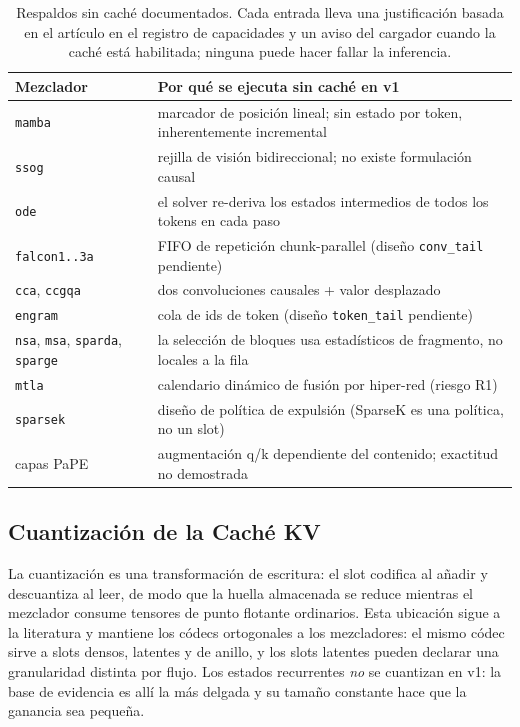 \begin{table}[H]
\centering
\small
\begin{tabularx}{0.98\linewidth}{l X}
\toprule
\textbf{Mezclador} & \textbf{Por qué se ejecuta sin caché en v1} \\
\midrule
\texttt{mamba} & marcador de posición lineal; sin estado por token, inherentemente incremental \\
\texttt{ssog} & rejilla de visión bidireccional; no existe formulación causal \\
\texttt{ode} & el solver re-deriva los estados intermedios de todos los tokens en cada paso \\
\texttt{falcon1..3a} & FIFO de repetición chunk-parallel (diseño \texttt{conv\_tail} pendiente) \\
\texttt{cca}, \texttt{ccgqa} & dos convoluciones causales + valor desplazado \\
\texttt{engram} & cola de ids de token (diseño \texttt{token\_tail} pendiente) \\
\texttt{nsa}, \texttt{msa}, \texttt{sparda}, \texttt{sparge} & la selección de bloques usa estadísticos de fragmento, no locales a la fila \\
\texttt{mtla} & calendario dinámico de fusión por hiper-red (riesgo R1) \\
\texttt{sparsek} & diseño de política de expulsión (SparseK es una política, no un slot) \\
capas PaPE & augmentación q/k dependiente del contenido; exactitud no demostrada \\
\bottomrule
\end{tabularx}
\caption{Respaldos sin caché documentados. Cada entrada lleva una justificación basada en el artículo en el registro de capacidades y un aviso del cargador cuando la caché está habilitada; ninguna puede hacer fallar la inferencia.}
\label{tab:kv-fallbacks}
\end{table}

\subsection{Cuantización de la Caché KV}
\label{sec:kv-quant}

La cuantización es una transformación de escritura: el slot codifica al añadir y descuantiza al leer, de modo que la huella almacenada se reduce mientras el mezclador consume tensores de punto flotante ordinarios. Esta ubicación sigue a la literatura y mantiene los códecs ortogonales a los mezcladores: el mismo códec sirve a slots densos, latentes y de anillo, y los slots latentes pueden declarar una granularidad distinta por flujo. Los estados recurrentes \emph{no} se cuantizan en v1: la base de evidencia es allí la más delgada y su tamaño constante hace que la ganancia sea pequeña.

